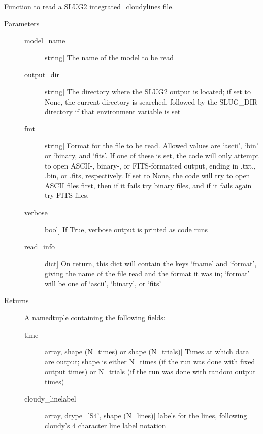 \documentclass[letterpaper,10pt,english]{sphinxmanual}
\begin{document}
\begin{fulllineitems}
\label{cloudy:slugpy.cloudy.read_integrated_cloudylines}
Function to read a SLUG2 integrated\_cloudylines file.
\begin{description}
\item[{Parameters}] \leavevmode\begin{description}
\item[{model\_name}] \leavevmode{[}string{]}
The name of the model to be read

\item[{output\_dir}] \leavevmode{[}string{]}
The directory where the SLUG2 output is located; if set to None,
the current directory is searched, followed by the SLUG\_DIR
directory if that environment variable is set

\item[{fmt}] \leavevmode{[}string{]}
Format for the file to be read. Allowed values are `ascii',
`bin' or `binary, and `fits'. If one of these is set, the code
will only attempt to open ASCII-, binary-, or FITS-formatted
output, ending in .txt., .bin, or .fits, respectively. If set
to None, the code will try to open ASCII files first, then if
it fails try binary files, and if it fails again try FITS
files.

\item[{verbose}] \leavevmode{[}bool{]}
If True, verbose output is printed as code runs

\item[{read\_info}] \leavevmode{[}dict{]}
On return, this dict will contain the keys `fname' and
`format', giving the name of the file read and the format it
was in; `format' will be one of `ascii', `binary', or `fits'

\end{description}

\item[{Returns}] \leavevmode
A namedtuple containing the following fields:
\begin{description}
\item[{time}] \leavevmode{[}array, shape (N\_times) or shape (N\_trials){]}
Times at which data are output; shape is either N\_times (if
the run was done with fixed output times) or N\_trials (if
the run was done with random output times)

\item[{cloudy\_linelabel}] \leavevmode{[}array, dtype='S4', shape (N\_lines){]}
labels for the lines, following cloudy's 4 character line label
notation


\end{description}
\end{description}
\end{fulllineitems}
\end{document}
